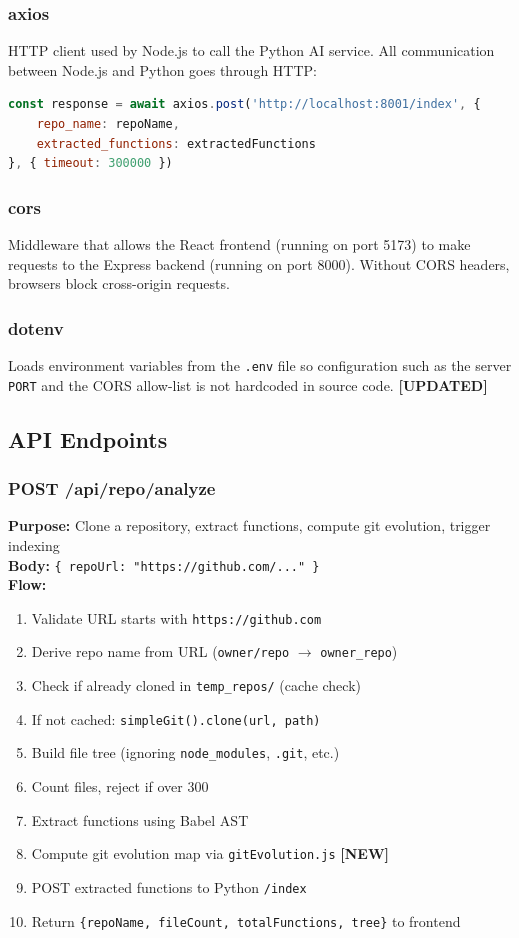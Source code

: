 \documentclass[a4paper,11pt]{article}
\begin{document}
\subsubsection{axios}
HTTP client used by Node.js to call the Python AI service. All communication between Node.js and Python goes through HTTP:
\begin{lstlisting}[language=JavaScript]
const response = await axios.post('http://localhost:8001/index', {
    repo_name: repoName,
    extracted_functions: extractedFunctions
}, { timeout: 300000 })
\end{lstlisting}

\subsubsection{cors}
Middleware that allows the React frontend (running on port 5173) to make requests to the Express backend (running on port 8000). Without CORS headers, browsers block cross-origin requests.

\subsubsection{dotenv}
Loads environment variables from the \texttt{.env} file so configuration such as the server \texttt{PORT} and the CORS allow-list is not hardcoded in source code. \textbf{[UPDATED]}

\subsection{API Endpoints}

\subsubsection{POST /api/repo/analyze}
\textbf{Purpose:} Clone a repository, extract functions, compute git evolution, trigger indexing\\[2pt]
\textbf{Body:} \texttt{\{ repoUrl: "https://github.com/..." \}}\\[4pt]
\textbf{Flow:}
\begin{enumerate}
    \item Validate URL starts with \texttt{https://github.com}
    \item Derive repo name from URL (\texttt{owner/repo} $\rightarrow$ \texttt{owner\_repo})
    \item Check if already cloned in \texttt{temp\_repos/} (cache check)
    \item If not cached: \texttt{simpleGit().clone(url, path)}
    \item Build file tree (ignoring \texttt{node\_modules}, \texttt{.git}, etc.)
    \item Count files, reject if over 300
    \item Extract functions using Babel AST
    \item Compute git evolution map via \texttt{gitEvolution.js} \textbf{[NEW]}
    \item POST extracted functions to Python \texttt{/index}
    \item Return \texttt{\{repoName, fileCount, totalFunctions, tree\}} to frontend
\end{enumerate}
\end{document}
